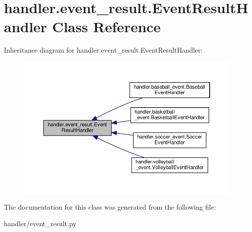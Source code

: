 \hypertarget{classhandler_1_1event__result_1_1_event_result_handler}{}\section{handler.\+event\+\_\+result.\+Event\+Result\+Handler Class Reference}
\label{classhandler_1_1event__result_1_1_event_result_handler}


Inheritance diagram for handler.\+event\+\_\+result.\+Event\+Result\+Handler\+:\nopagebreak
\begin{figure}[H]
\begin{center}
\leavevmode
\includegraphics[width=350pt]{classhandler_1_1event__result_1_1_event_result_handler__inherit__graph}
\end{center}
\end{figure}


The documentation for this class was generated from the following file\+:\begin{DoxyCompactItemize}
\item 
handler/event\+\_\+result.\+py\end{DoxyCompactItemize}

